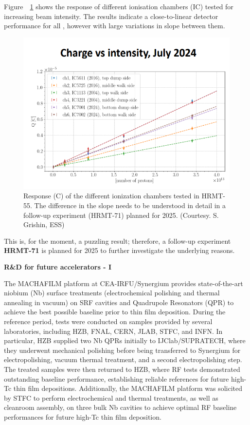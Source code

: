 Figure~~\ref{fig:hiradmat_IC_response} shows the response of different ionisation chambers (IC) tested for increasing beam intensity. The results indicate a close-to-linear detector performance for all , however with large variations in slope between them. 
\begin{figure}[H]
    \centering
    \includegraphics[width=0.8\linewidth]{graphics/hiradmat_IC_response.png}
    \caption{Response (C) of the different ionization chambers tested in HRMT-55. The difference in the slope needs to be understood in detail in a follow-up experiment (HRMT-71) planned for 2025. (Courtesy. S. Grishin, ESS)}
    \label{fig:hiradmat_IC_response}
\end{figure}
This is, for the moment, a puzzling result; therefore, a follow-up experiment \textbf{HRMT-71} is planned for 2025 to further investigate the underlying reasons.

\textbf{R\&D for future accelerators - I} \mbox{}

The MACHAFILM platform at CEA-IRFU/Synergium provides state-of-the-art niobium (Nb) surface treatments (electrochemical polishing and thermal annealing in vacuum) on SRF cavities and Quadrupole Resonators (QPR) to achieve the best possible baseline prior to thin film deposition. During the reference period, tests were conducted on samples provided by several laboratories, including HZB, FNAL, CERN, JLAB, STFC, and INFN. In particular, HZB supplied two Nb QPRs initially to IJClab/SUPRATECH, where they underwent mechanical polishing before being transferred to Synergium for electropolishing, vacuum thermal treatment, and a second electropolishing step. The treated samples were then returned to HZB, where RF tests demonstrated outstanding baseline performance, establishing reliable references for future high-Tc thin film depositions. Additionally, the MACHAFILM platform was solicited by STFC to perform electrochemical and thermal treatments, as well as cleanroom assembly, on three bulk Nb cavities to achieve optimal RF baseline performances for future high-Tc thin film deposition.

